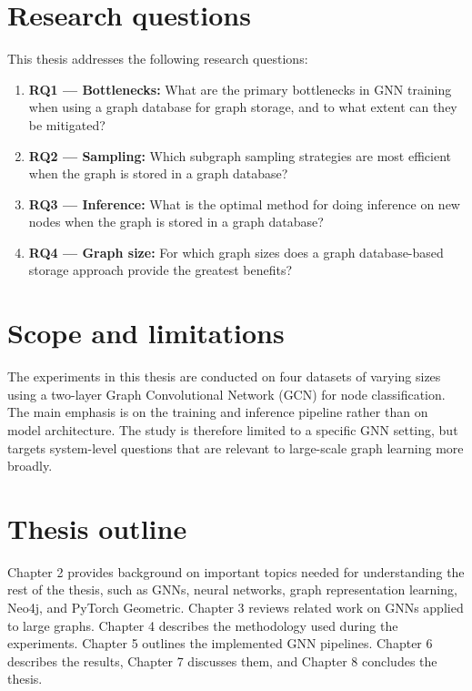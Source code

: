 \documentclass[PhD,single]{uclathes}
\begin{document}
\section{Research questions}
This thesis addresses the following research questions:

\begin{enumerate}
    \item \textbf{RQ1 --- Bottlenecks:}\label{question:bottleneck} What are the primary bottlenecks in GNN training when using a graph database for graph storage, and to what extent can they be mitigated?
    \item \textbf{RQ2 --- Sampling:}\label{question:sampling} Which subgraph sampling strategies are most efficient when the graph is stored in a graph database?
    \item \textbf{RQ3 --- Inference:}\label{question:inference} What is the optimal method for doing inference on new nodes when the graph is stored in a graph database?
    \item \textbf{RQ4 --- Graph size:}\label{question:graphsize} For which graph sizes does a graph database-based storage approach provide the greatest benefits?
\end{enumerate}

\section{Scope and limitations}
The experiments in this thesis are conducted on four datasets of varying sizes
using a two-layer Graph Convolutional Network (GCN) for node classification.
The main emphasis is on the training and inference pipeline rather than on model
architecture. The study is therefore limited to a specific GNN setting, but
targets system-level questions that are relevant to large-scale graph learning
more broadly.

\section{Thesis outline}
Chapter 2 provides background on important topics needed for understanding the
rest of the thesis, such as GNNs, neural networks, graph representation
learning, Neo4j, and PyTorch Geometric. Chapter 3 reviews related work on GNNs
applied to large graphs. Chapter 4 describes the methodology used during the
experiments. Chapter 5 outlines the implemented GNN pipelines. Chapter 6
describes the results, Chapter 7 discusses them, and Chapter 8 concludes the
thesis.
\end{document}
